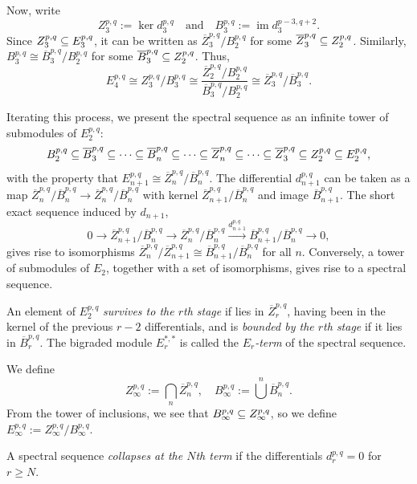 \documentclass{MetricNotes2023}
\def\subq{\ensuremath\subseteq}
\DeclareMathOperator{\im}{im}
\begin{document}
Now, write 
\[Z_3^{p, q}:=\ker d_3^{p,q} \quad \text{and} \quad B_3^{p,q}:=\im d_3^{p-3,q+2}.\]
Since \(Z_3^{p,q}\subq E^{p,q}_3\), it can be written as \(\overline{Z}_3^{p,q}/B_2^{p,q}\) for some \(\overline{Z}_3^{p,q}\subq Z_2^{p,q}\). Similarly, \(B_3^{p,q}\cong \overline B_3^{p,q}/B_2^{p,q}\) for some \(\overline B_3^{p,q}\subq Z_2^{p,q}\). Thus,
\[E_4^{p,q}\cong Z_3^{p,q}/B_3^{p,q}\cong \frac{\overline Z_2^{p,q}/B_2^{p,q}}{\overline B_3^{p,q}/B_2^{p,q}}\cong \overline Z_3^{p,q}/\overline B_3^{p,q}.\]

Iterating this process, we present the spectral sequence as an infinite tower of submodules of \(E_2^{p,q}\):
\[B_2^{p,q}\subq \overline B_3^{p,q}\subq \cdots \subq \overline B_n^{p,q}\subq \cdots \subq \overline Z_n^{p,q}\subq \cdots \subq \overline Z_3^{p,q}\subq Z_2^{p,q}\subq E_2^{p,q},\]
with the property that \(E^{p,q}_{n+1}\cong \overline Z_n^{p,q}/\overline B_n^{p,q}\). The differential \(d_{n+1}^{p,q}\) can be taken as a map \(\overline Z^{p,q}_n/\overline B_n^{p,q}\to\overline Z_n^{p,q}/\overline B_n^{p,q}\) with kernel \(\overline Z_{n+1}^{p,q}/\overline B_n^{p,q}\) and image \(\overline B_{n+1}^{p,q}\). The short exact sequence induced by \(d_{n+1}\),
\[0 \to \overline Z^{p,q}_{n+1}/\overline B_n^{p,q}\to \overline Z_n^{p,q}/\overline B_n^{p,q} \xrightarrow{d_{n+1}^{p,q}} \overline B_{n+1}^{p,q}/\overline{B}_n^{p,q}\to 0,\]
gives rise to isomorphisms \(\overline{Z}_n^{p,q}/\overline{Z}_{n+1}^{p,q}\cong \overline{B}_{n+1}^{p,q}/\overline{B}_n ^{p,q}\) for all \(n\). Conversely, a tower of submodules of \(E_2\), together with a set of isomorphisms, gives rise to a spectral sequence. 

\begin{definition}
An element of \(E_2^{p,q}\) \textit{survives to the \(r\)th stage} if lies in \(\overline{Z}_r^{p,q}\), having been in the kernel of the previous \(r-2\) differentials, and is \textit{bounded by the \(r\)th stage} if it lies in \(\overline{B}_r^{p,q}\). The bigraded module \(E_r^{*,*}\) is called the \textit{\(E_r\)-term} of the spectral sequence. 
\end{definition}

We define 
\[Z_\infty^{p,q}:= \bigcap_n \overline{Z}^{p,q}_n, \quad B_\infty^{p,q}:=\bigcup^n \overline{B}^{p,q}_n.\]
From the tower of inclusions, we see that \(B_\infty^{p,q}\subq Z^{p,q}_\infty\), so we define \(E_\infty^{p,q}:=Z_\infty^{p,q}/B_\infty^{p,q}\). 

\begin{definition}
A spectral sequence \textit{collapses at the \(N\)th term} if the differentials \(d_r^{p,q}=0\) for \(r\geq N\). 
\end{definition}
\end{document}
